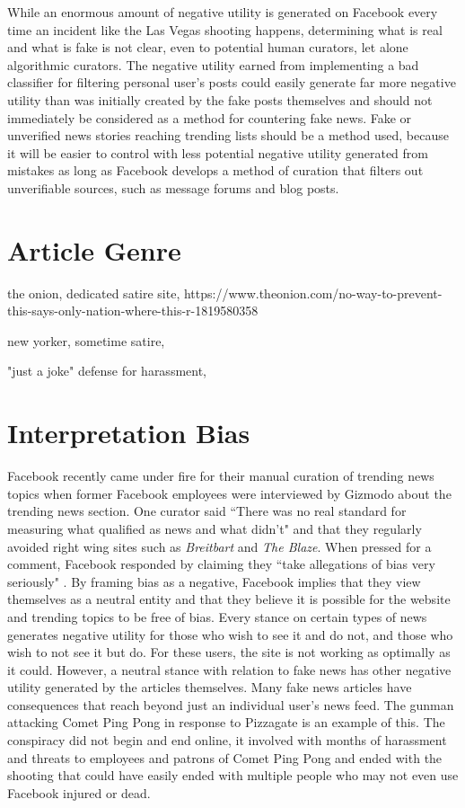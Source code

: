 \documentclass[12pt]{article}
\begin{document}
While an enormous amount of negative utility is generated on Facebook every time an incident like the Las Vegas shooting happens, determining what is real and what is fake is not clear, even to potential human curators, let alone algorithmic curators. The negative utility earned from implementing a bad classifier for filtering personal user's posts could easily generate far more negative utility than was initially created by the fake posts themselves and should not immediately be considered as a method for countering fake news. Fake or unverified news stories reaching trending lists should be a method used, because it will be easier to control with less potential negative utility generated from mistakes as long as Facebook develops a method of curation that filters out unverifiable sources, such as message forums and blog posts. 

\section{Article Genre}

the onion, dedicated satire site, https://www.theonion.com/no-way-to-prevent-this-says-only-nation-where-this-r-1819580358

new yorker, sometime satire, 

"just a joke" defense for harassment, 



\section{Interpretation Bias}
Facebook recently came under fire for their manual curation of trending news topics when former Facebook employees were interviewed by Gizmodo about the trending news section. One curator said ``There was no real standard for measuring what qualified as news and what didn't" and that they regularly avoided right wing sites such as \textit{Breitbart} and \textit{The Blaze}. When pressed for a comment, Facebook responded by claiming they ``take allegations of bias very seriously" \citep{gizmodo_fb_news_curation}. By framing bias as a negative, Facebook implies that they view themselves as a neutral entity and that they believe it is possible for the website and trending topics to be free of bias. Every stance on certain types of news generates negative utility for those who wish to see it and do not, and those who wish to not see it but do. For these users, the site is not working as optimally as it could. However, a neutral stance with relation to fake news has other negative utility generated by the articles themselves. Many fake news articles have consequences that reach beyond just an individual user's news feed. The gunman attacking Comet Ping Pong in response to Pizzagate is an example of this. The conspiracy did not begin and end online, it involved with months of harassment and threats to employees and patrons of Comet Ping Pong and ended with the shooting that could have easily ended with multiple people who may not even use Facebook injured or dead.
\end{document}
